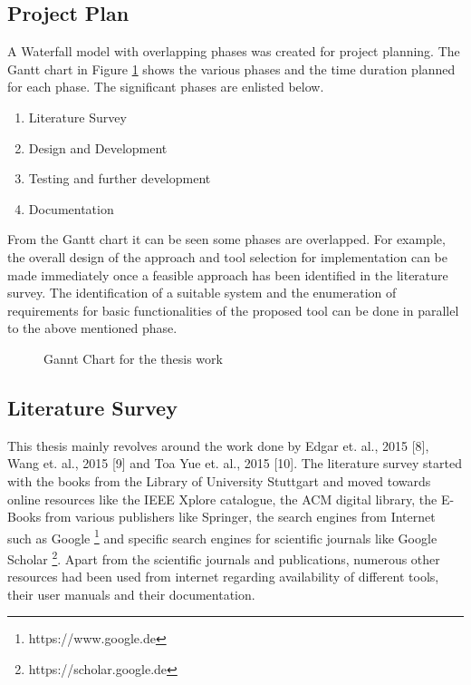 \subsection{Project Plan}
A Waterfall model with overlapping phases was created for project planning. The Gantt chart in Figure \ref{fig:gc} shows the various phases and the time duration planned for each phase. 
The significant phases are enlisted below.
\begin{enumerate}
\item Literature Survey
\item Design and Development
\item Testing and further development
\item Documentation
\end{enumerate}
From the Gantt chart it can be seen some phases are overlapped. For example, the overall design of the approach and tool selection for implementation can be made immediately once a feasible approach has been identified in the literature survey. The identification of a suitable system and the enumeration of requirements for basic functionalities of the proposed tool can be done in parallel to the above mentioned phase.
\begin{figure}[htb!]
\centering
{}
\caption{Gannt Chart for the thesis work}
\label{fig:gc}
\end{figure}
\subsection{Literature Survey}
This thesis mainly revolves around the work done by Edgar et. al., 2015 [8], Wang et. al., 2015 [9] and Toa Yue et. al., 2015 [10]. The literature survey started with the books from the Library of University Stuttgart and moved towards online resources like the IEEE Xplore catalogue, the ACM digital library, the E-Books from various publishers like Springer, the search engines from Internet such as Google \footnote{https://www.google.de} and specific search engines for scientific journals like Google Scholar \footnote{https://scholar.google.de}. Apart from the scientific journals and publications, numerous other resources had been used from internet regarding availability of different tools, their user manuals and their documentation.
